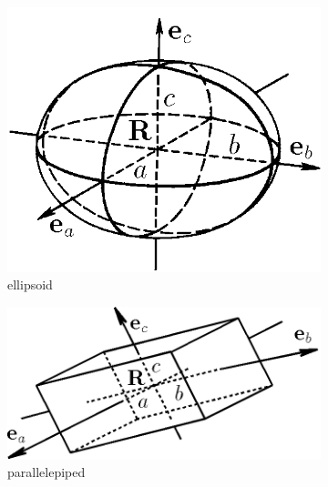 \noindent
\begin{figure}[htb]
\begin{subfigure}[b]{.3\textwidth}
   \centering
   \includegraphics[width=\textwidth,height=0.8\textwidth]{ELLIPSE.png}
   \caption{ellipsoid}
   \label{fig:opo_ell}
\end{subfigure}
\hfill
\begin{subfigure}[b]{.3\textwidth}
   \centering
   \includegraphics[width=\textwidth]{PAREPIP.png}
   \caption{parallelepiped}
   \label{fig:opo_parep}
\end{subfigure}
\hfill
\begin{subfigure}[b]{0.3\textwidth}
   \centering

\end{subfigure}
\end{figure}
